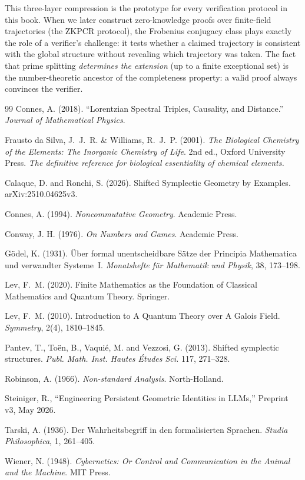 This three-layer compression is the prototype for every verification protocol in this book. When we later construct zero-knowledge proofs over finite-field trajectories (the ZKPCR protocol), the Frobenius conjugacy class plays exactly the role of a verifier's challenge: it tests whether a claimed trajectory is consistent with the global structure without revealing which trajectory was taken. The fact that prime splitting \emph{determines the extension} (up to a finite exceptional set) is the number-theoretic ancestor of the completeness property: a valid proof always convinces the verifier.




\vspace{2em}
\begin{thebibliography}{99}
Connes, A. (2018).
``Lorentzian Spectral Triples, Causality, and Distance.''
\textit{Journal of Mathematical Physics}.

Frausto da Silva, J.~J.~R. \& Williams, R.~J.~P. (2001).
\textit{The Biological Chemistry of the Elements: The Inorganic Chemistry of Life}.
2nd ed., Oxford University Press.
\textit{The definitive reference for biological essentiality of chemical elements.}

Calaque, D. and Ronchi, S. (2026). Shifted Symplectic Geometry by Examples. arXiv:2510.04625v3.

Connes, A. (1994). \emph{Noncommutative Geometry}. Academic Press.

Conway, J. H. (1976). \emph{On Numbers and Games}. Academic Press.

G\"odel, K. (1931). \"Uber formal unentscheidbare S\"atze der Principia Mathematica und verwandter Systeme~I. \emph{Monatshefte f\"ur Mathematik und Physik}, 38, 173--198.

Lev, F.~M. (2020).
Finite Mathematics as the Foundation of Classical Mathematics and Quantum Theory.
Springer.

Lev, F.~M. (2010).
Introduction to A Quantum Theory over A Galois Field.
\emph{Symmetry}, 2(4), 1810--1845.

Pantev, T., To\"en, B., Vaqui\'e, M. and Vezzosi, G. (2013). Shifted symplectic structures. \emph{Publ. Math. Inst. Hautes \'Etudes Sci.} 117, 271--328.

Robinson, A. (1966). \emph{Non-standard Analysis}. North-Holland.

Steiniger, R.,
``Engineering Persistent Geometric Identities in LLMs,''
Preprint v3, May 2026.

Tarski, A. (1936). Der Wahrheitsbegriff in den formalisierten Sprachen. \emph{Studia Philosophica}, 1, 261--405.

Wiener, N. (1948). \emph{Cybernetics: Or Control and Communication in the Animal and the Machine}. MIT Press.

\end{thebibliography}
